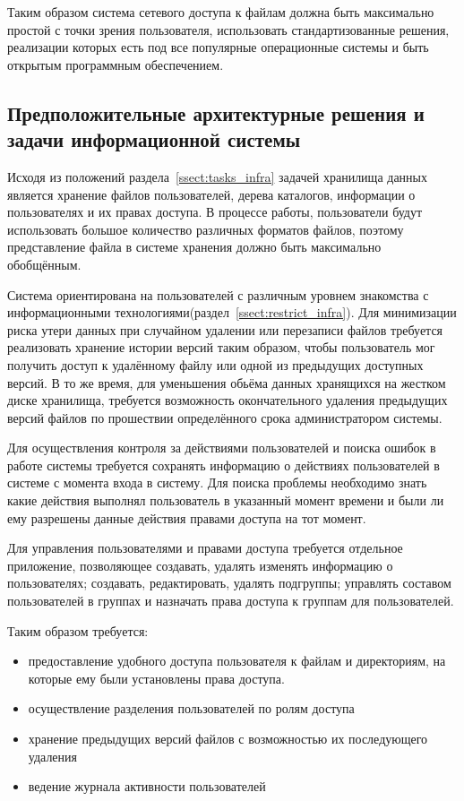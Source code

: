 \documentclass[utf8,usehyperref,12pt]{G7-32}
\begin{document}
Таким образом система сетевого доступа к файлам должна быть максимально простой с точки зрения пользователя, использовать стандартизованные решения, реализации которых есть под все популярные операционные системы и быть открытым программным обеспечением.

\subsection{Предположительные архитектурные решения и задачи информационной системы}\label{ssect_arch_tasks}
Исходя из положений раздела~\ref{ssect:tasks_infra} задачей хранилища данных является хранение файлов пользователей, дерева каталогов, информации о пользователях и их правах доступа. В процессе работы, пользователи будут использовать большое количество различных форматов файлов, поэтому представление файла в системе хранения должно быть максимально обобщённым. 

Система ориентирована на пользователей с различным уровнем знакомства с информационными технологиями(раздел~\ref{ssect:restrict_infra}). Для минимизации риска утери данных при случайном удалении или перезаписи файлов требуется реализовать хранение истории версий таким образом, чтобы пользователь мог получить доступ к удалённому файлу или одной из предыдущих доступных версий. В то же время, для уменьшения обьёма данных хранящихся на жестком диске хранилища, требуется возможность окончательного удаления предыдущих версий файлов по прошествии определённого срока администратором системы.

Для осуществления контроля за действиями пользователей и поиска ошибок в работе системы требуется сохранять информацию о действиях пользователей в системе с момента входа в систему. Для поиска проблемы необходимо знать какие действия выполнял пользователь в указанный момент времени и были ли ему разрешены данные действия правами доступа на тот момент.

Для управления пользователями и правами доступа требуется отдельное приложение, позволяющее создавать, удалять изменять информацию о пользователях; создавать, редактировать, удалять подгруппы; управлять составом пользователей в группах и назначать права доступа к группам для пользователей.

Таким образом требуется:
\begin{itemize}
\item предоставление удобного доступа пользователя к файлам и директориям, на которые ему были установлены права доступа.
\item осуществление разделения пользователей по ролям доступа
\item хранение предыдущих версий файлов с возможностью их последующего удаления
\item ведение журнала активности пользователей
\end{itemize}
\end{document}
